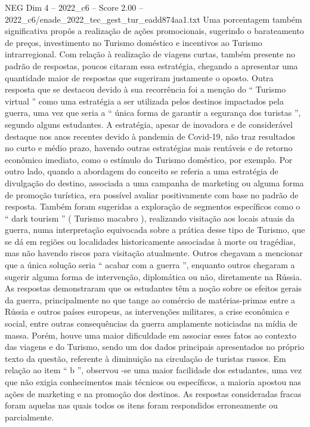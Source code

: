 \begin{textsample}{NEG Dim 4 – 2022\_c6 – Score 2.00 – 2022\_c6/enade\_2022\_tec\_gest\_tur\_eadd874aa1.txt}
Uma porcentagem também significativa propôs a realização de ações promocionais, sugerindo o barateamento de preços, investimento no Turismo doméstico e incentivos ao Turismo intrarregional.
Com relação à realização de viagens curtas, também presente no padrão de respostas, poucos citaram essa estratégia, chegando a apresentar uma quantidade maior de respostas que sugeriram justamente o oposto.
Outra resposta que se destacou devido à sua recorrência foi a menção do “ Turismo virtual ” como uma estratégia a ser utilizada pelos destinos impactados pela guerra, uma vez que seria a “ única forma de garantir a segurança dos turistas ”, segundo alguns estudantes.
A estratégia, apesar de inovadora e de considerável destaque nos anos recentes devido à pandemia de Covid-19, não traz resultados no curto e médio prazo, havendo outras estratégias mais rentáveis e de retorno econômico imediato, como o estímulo do Turismo doméstico, por exemplo.
Por outro lado, quando a abordagem do conceito se referia a uma estratégia de divulgação do destino, associada a uma campanha de marketing ou alguma forma de promoção turística, era possível avaliar positivamente com base no padrão de resposta.
Também foram sugeridas a exploração de segmentos específicos como o “ dark tourism ” ( Turismo macabro ), realizando visitação aos locais atuais da guerra, numa interpretação equivocada sobre a prática desse tipo de Turismo, que se dá em regiões ou localidades historicamente associadas à morte ou tragédias, mas não havendo riscos para visitação atualmente.
Outros chegavam a mencionar que a única solução seria “ acabar com a guerra ”, enquanto outros chegaram a sugerir alguma forma de intervenção, diplomática ou não, diretamente na Rússia.
As respostas demonstraram que os estudantes têm a noção sobre os efeitos gerais da guerra, principalmente no que tange ao comércio de matérias-primas entre a Rússia e outros países europeus, as intervenções militares, a crise econômica e social, entre outras consequências da guerra amplamente noticiadas na mídia de massa.
Porém, houve uma maior dificuldade em associar esses fatos ao contexto das viagens e do Turismo, sendo um dos dados principais apresentados no próprio texto da questão, referente à diminuição na circulação de turistas russos.
Em relação ao item “ b ”, observou -se uma maior facilidade dos estudantes, uma vez que não exigia conhecimentos mais técnicos ou específicos, a maioria apostou nas ações de marketing e na promoção dos destinos.
As respostas consideradas fracas foram aquelas nas quais todos os itens foram respondidos erroneamente ou parcialmente.

\end{textsample}
